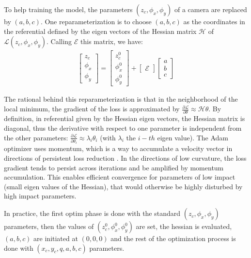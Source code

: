 \documentclass[a4paper,twoside,french]{article}
\begin{document}
To help training the model, the parameters $(z_c, \phi_x, \phi_y)$ of a camera are replaced by $(a, b, c)$.
One reparameterization is to choose $(a, b, c)$ as the coordinates in the referential defined by the eigen vectors of
the Hessian matrix $\mathcal{H}$ of $\mathcal{L}(z_c,\phi_x,\phi_y)$. Calling $\mathcal{E}$ this matrix, we have:
\begin{align}
	\label{eq:abc}
	\begin{bmatrix}z_c\\\phi_x\\\phi_y\end{bmatrix} = \begin{bmatrix}z_{c}^0\\\phi_x^0\\\phi_y^0\end{bmatrix} + \begin{bmatrix}\mathcal{E}\end{bmatrix} \begin{bmatrix}a\\b\\c\end{bmatrix}
\end{align}

The rational behind this reparameterization is that in the neighborhood of the local minimum, the gradient of the
loss is approximated by $\frac{\partial\mathcal{L}}{\partial\theta} \approx \mathcal{H}\theta$.
By definition, in referential given by the Hessian eigen vectors, the Hessian matrix is diagonal, thus the derivative with respect to
one parameter is independent from the other parameters: $\frac{\partial\mathcal{L}}{\partial\theta_i} \approx \lambda_i\theta_i$
(with $\lambda_i$ the $i - th$ eigen value).
The Adam optimizer \cite{kingma2014adam} uses momentum, which is a way to accumulate 
a velocity vector in directions of persistent loss reduction
\cite{sutskever2013importance}. In the directions of low curvature, the loss gradient
tends to persist across iterations and be amplified by momentum accumulation. This enables efficient convergence
for parameters of low impact (small eigen values of the Hessian), that would otherwise be highly disturbed by high
impact parameters.

In practice, the first optim phase is done with the standard $(z_c,\phi_x,\phi_y)$ parameters, then the values of $(z_{c}^0,\phi_x^0,\phi_y^0)$ are set,
the hessian is evaluated, $(a,b,c)$ are initiated at $(0,0,0)$ and the rest of the optimization process is done with $(x_c,y_c,q,a,b,c)$ parameters.
\end{document}
